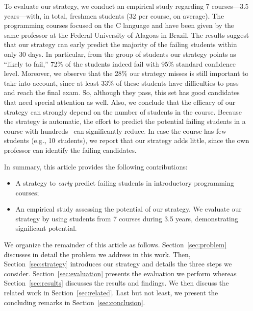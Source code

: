 To evaluate our strategy, we conduct an empirical study regarding 7 courses---3.5 years---with, in total, \totalStudents freshmen students (32 per course, on average). The programming courses focused on the C language and have been given by the same professor at the Federal University of Alagoas in Brazil. The results suggest that our strategy can early predict the majority of the failing students within only 30 days. In particular, from the group of students our strategy points as ``likely to fail,'' 72\% of the students indeed fail with 95\% standard confidence level. Moreover, we observe that the 28\% our strategy misses is still important to take into account, since at least 33\% of these students have difficulties to pass and reach the final exam. So, although they pass, this set has good candidates that need special attention as well. Also, we conclude that the efficacy of our strategy can strongly depend on the number of students in the course. Because the strategy is automatic, the effort to predict the potential failing students in a course with hundreds~\cite{bennedsen-sigcse-failure-rates-2007} can significantly reduce. In case the course has few students (e.g., 10 students), we report that our strategy adds little, since the own professor can identify the failing candidates.


In summary, this article provides the following contributions:

\begin{itemize}

	\item A strategy to \textit{early} predict failing students in introductory programming courses;
	
	\item An empirical study assessing the potential of our strategy. We evaluate our strategy by using \totalStudents students from 7 courses during 3.5 years, demonstrating significant potential.

\end{itemize}

We organize the remainder of this article as follows. Section~\ref{sec:problem} discusses in detail the problem we address in this work. Then, Section~\ref{sec:strategy} introduces our strategy and details the three steps we consider. Section~\ref{sec:evaluation} presents the evaluation we perform whereas Section~\ref{sec:results} discusses the results and findings. We then discuss the related work in Section~\ref{sec:related}. Last but not least, we present the concluding remarks in Section~\ref{sec:conclusion}.